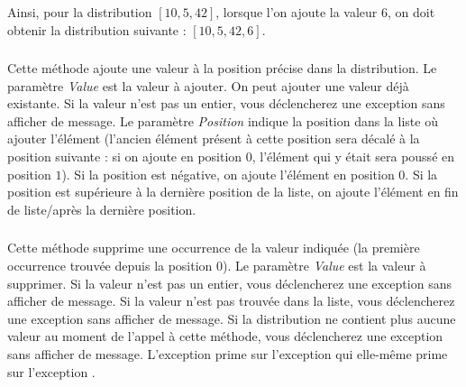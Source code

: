 \medskip

\noindent Ainsi, pour la distribution $ [ 10, 5, 42 ] $, lorsque l'on ajoute la valeur $ 6 $, on doit obtenir la distribution suivante : $ [ 10, 5, 42, 6 ] $.


\subsubsection*{}

\noindent Cette méthode ajoute une valeur à la position précise dans la distribution.
Le paramètre \textit{Value} est la valeur à ajouter.
On peut ajouter une valeur déjà existante.
Si la valeur n'est pas un entier, vous déclencherez une exception  sans afficher de message.
Le paramètre \textit{Position} indique la position dans la liste où ajouter l'élément (l'ancien élément présent à cette position sera décalé à la position suivante : si on ajoute en position $ 0 $, l'élément qui y était sera poussé en position $ 1 $).
Si la position est négative, on ajoute l'élément en position $ 0 $.
Si la position est supérieure à la dernière position de la liste, on ajoute l'élément en fin de liste/après la dernière position.


\subsubsection*{}

\noindent Cette méthode supprime une occurrence de la valeur indiquée (la première occurrence trouvée depuis la position $ 0 $).
Le paramètre \textit{Value} est la valeur à supprimer.
Si la valeur n'est pas un entier, vous déclencherez une exception  sans afficher de message.
Si la valeur n'est pas trouvée dans la liste, vous déclencherez une exception  sans afficher de message.
Si la distribution ne contient plus aucune valeur au moment de l'appel à cette méthode, vous déclencherez une exception  sans afficher de message.
L'exception  prime sur l'exception  qui elle-même prime sur l'exception .


\subsubsection*{}

